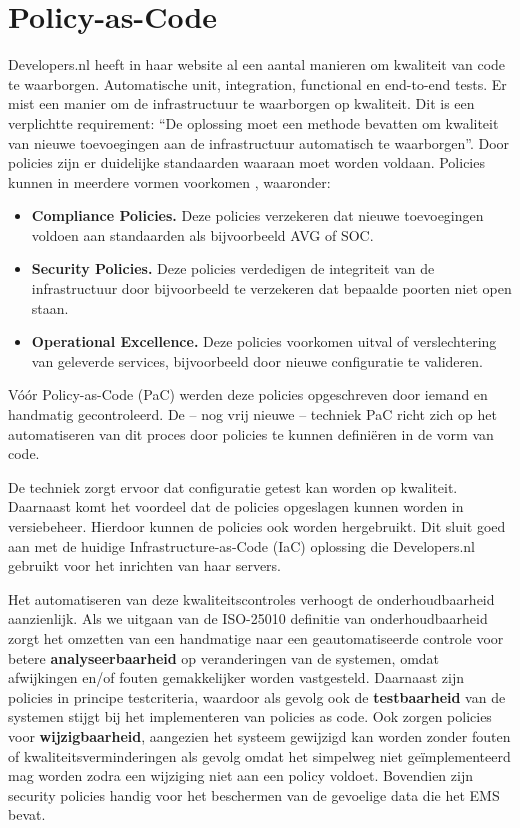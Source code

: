 \section{Policy-as-Code} %
Developers.nl heeft in haar website al een aantal manieren om kwaliteit van code te waarborgen. Automatische unit, integration, functional en end-to-end tests. Er mist een manier om de infrastructuur te waarborgen op kwaliteit. Dit is een verplichtte requirement: \enquote{De oplossing moet een methode bevatten om kwaliteit van nieuwe toevoegingen aan de infrastructuur automatisch te waarborgen}. Door policies zijn er duidelijke standaarden waaraan moet worden voldaan. Policies kunnen in meerdere vormen voorkomen \parencite{WhyPaC}, waaronder:
\begin{itemize}
	\item \textbf{Compliance Policies.} Deze policies verzekeren dat nieuwe toevoegingen voldoen aan standaarden als bijvoorbeeld AVG of SOC.
	\item \textbf{Security Policies.} Deze policies verdedigen de integriteit van de infrastructuur door bijvoorbeeld te verzekeren dat bepaalde poorten niet open staan.
	\item \textbf{Operational Excellence.} Deze policies voorkomen uitval of verslechtering van geleverde services, bijvoorbeeld door nieuwe configuratie te valideren.
\end{itemize}

Vóór Policy-as-Code (PaC) werden deze policies opgeschreven door iemand en handmatig gecontroleerd. De -- nog vrij nieuwe -- techniek PaC richt zich op het automatiseren van dit proces door policies te kunnen definiëren in de vorm van code. 

De techniek zorgt ervoor dat configuratie getest kan worden op kwaliteit. Daarnaast komt het voordeel dat de policies opgeslagen kunnen worden in versiebeheer. Hierdoor kunnen de policies ook worden hergebruikt. Dit sluit goed aan met de huidige Infrastructure-as-Code (IaC) oplossing die Developers.nl gebruikt voor het inrichten van haar servers.

Het automatiseren van deze kwaliteitscontroles verhoogt de onderhoudbaarheid aanzienlijk. Als we uitgaan van de ISO-25010 definitie van onderhoudbaarheid \parencite{ISO25010} zorgt het omzetten van een handmatige naar een geautomatiseerde controle voor betere \textbf{analyseerbaarheid} op veranderingen van de systemen, omdat afwijkingen en/of fouten gemakkelijker worden vastgesteld. Daarnaast zijn policies in principe testcriteria, waardoor als gevolg ook de \textbf{testbaarheid} van de systemen stijgt bij het implementeren van policies as code. Ook zorgen policies voor \textbf{wijzigbaarheid}, aangezien het systeem gewijzigd kan worden zonder fouten of kwaliteitsverminderingen als gevolg omdat het simpelweg niet geïmplementeerd mag worden zodra een wijziging niet aan een policy voldoet. Bovendien zijn security policies handig voor het beschermen van de gevoelige data die het EMS bevat.

